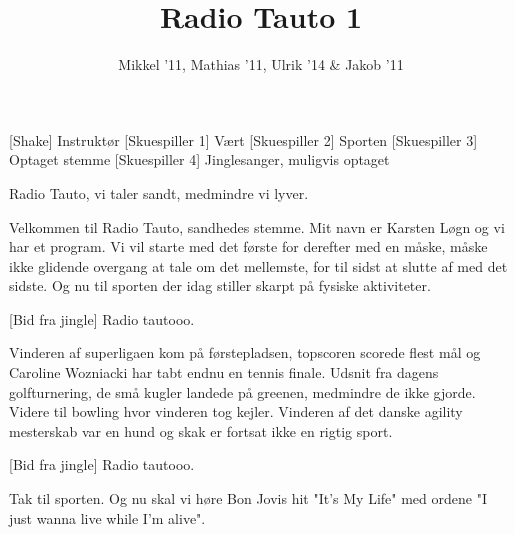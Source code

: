 \documentclass[a4paper,11pt]{article}
\title{Radio Tauto 1}
\author{Mikkel '11, Mathias '11, Ulrik '14 \& Jakob '11}
\begin{document}
\maketitle

\begin{roles}
[Shake] Instruktør
[Skuespiller 1] Vært
[Skuespiller 2] Sporten
[Skuespiller 3] Optaget stemme %
[Skuespiller 4] Jinglesanger, muligvis optaget
\end{roles}


\begin{sketch}



 Radio Tauto, vi taler sandt, medmindre vi lyver.

 Velkommen til Radio Tauto, sandhedes stemme. Mit navn er Karsten Løgn og vi har et program. Vi vil starte med det første for derefter med en måske, måske ikke glidende overgang at tale om det mellemste, for til sidst at slutte af med det sidste. Og nu til sporten der idag stiller skarpt på fysiske aktiviteter.

[Bid fra jingle] Radio tautooo.

 Vinderen af superligaen kom på førstepladsen, topscoren scorede flest mål og Caroline Wozniacki har tabt endnu en tennis finale.  Udsnit fra dagens golfturnering, de små kugler landede på greenen, medmindre de ikke gjorde. Videre til bowling hvor vinderen tog kejler. Vinderen af det danske agility mesterskab var en hund og skak er fortsat ikke en rigtig sport. %


[Bid fra jingle] Radio tautooo.

 Tak til sporten. Og nu skal vi høre Bon Jovis hit "It's My Life" med ordene "I just wanna live while I'm alive". %













\end{sketch}
\end{document}
